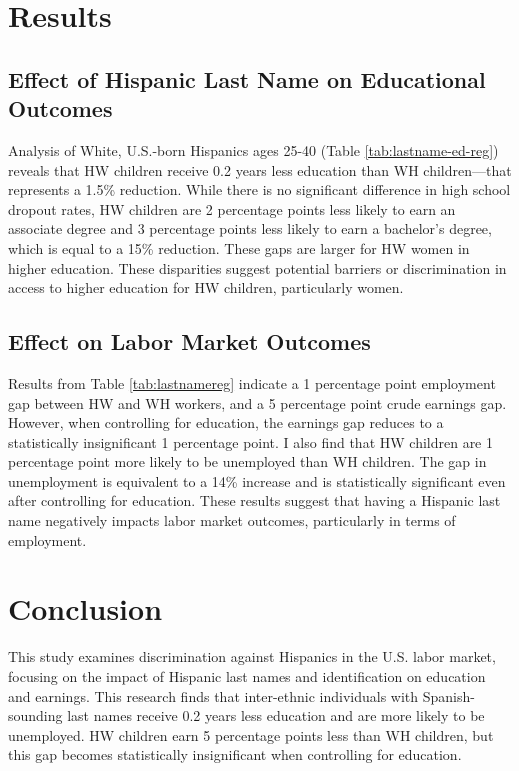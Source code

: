 \documentclass[a4paper,fleqn]{cas-sc}
\begin{document}
\section{Results}\label{sec:results}

\subsection{Effect of Hispanic Last Name on Educational Outcomes}

Analysis of White, U.S.-born Hispanics ages 25-40 (Table \ref{tab:lastname-ed-reg}) reveals that HW children receive 0.2 years less education than WH children---that represents a 1.5\% reduction. While there is no significant difference in high school dropout rates, HW children are 2 percentage points less likely to earn an associate degree and 3 percentage points less likely to earn a bachelor's degree, which is equal to a 15\% reduction. These gaps are larger for HW women in higher education. These disparities suggest potential barriers or discrimination in access to higher education for HW children, particularly women.

\subsection{Effect on Labor Market Outcomes}

Results from Table \ref{tab:lastnamereg} indicate a 1 percentage point employment gap between HW and WH workers, and a 5 percentage point crude earnings gap. However, when controlling for education, the earnings gap reduces to a statistically insignificant 1 percentage point. I also find that HW children are 1 percentage point more likely to be unemployed than WH children. The gap in unemployment is equivalent to a 14\% increase and is statistically significant even after controlling for education. These results suggest that having a Hispanic last name negatively impacts labor market outcomes, particularly in terms of employment.

\section{Conclusion}\label{sec:con1}

This study examines discrimination against Hispanics in the U.S. labor market, focusing on the impact of Hispanic last names and identification on education and earnings. This research finds that inter-ethnic individuals with Spanish-sounding last names receive 0.2 years less education and are more likely to be unemployed. HW children earn 5 percentage points less than WH children, but this gap becomes statistically insignificant when controlling for education.
\end{document}
